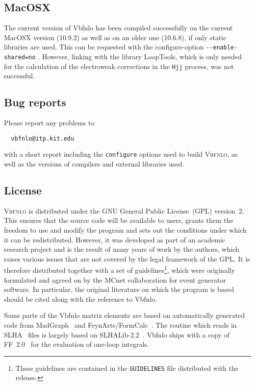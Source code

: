 \documentclass[english,12pt]{article}
\begin{document}
\subsection{MacOSX}

The current version of {\sc Vbfnlo} has been compiled successfully 
on the current MacOSX version (10.9.2) as well as on an older one
(10.6.8), if only static libraries are used. This can be
requested with the configure-option {\tt -{}-enable-shared=no} .
However, linking with the library {\sc LoopTools}, which is only
needed for the calculation of the electroweak corrections in the {\tt Hjj}
process, was not successful.



\subsection{Bug reports}

Please report any problems to
\begin{verbatim}
  vbfnlo@itp.kit.edu
\end{verbatim}
with a short report including the {\tt configure} options used to build
\textsc{Vbfnlo}, as well as the versions of compilers and external libraries
used.

\subsection{License}

\textsc{Vbfnlo} is distributed under the GNU General Public License~(GPL)
version~2. This ensures that the source code will be available to users,
grants them the freedom to use and modify the program and sets
out the conditions under which it can be redistributed. However, it was
developed as part of an academic research project and is the result of
many years of work by the authors, which raises various issues that are
not covered by the legal framework of the GPL. It is therefore
distributed together with a set of guidelines\footnote{These guidelines
are contained in the \texttt{GUIDELINES} file distributed with the
release.}, which were originally formulated and agreed on by the
MCnet collaboration for event generator software.
In particular, the original literature on which the program is based
should be cited along with the reference to {\sc Vbfnlo}.

Some parts of the {\sc Vbfnlo} matrix elements are based on automatically
generated code from {\sc MadGraph}~\cite{Stelzer:1994ta, Alwall:2007st}
and {\sc FeynArts/FormCalc}~\cite{Kublbeck:1990xc, Denner:1992vza, 
Kublbeck:1992mt, Hahn:2000kx, Hahn:2001rv, Hahn:1998yk, Hahn:2006zy, Hahn:2006qw}.
The routine which reads in SLHA~\cite{Allanach:2008qq} files is largely based 
on {\sc SLHALib-2.2}~\cite{Hahn:2006nq}.
{\sc Vbfnlo} ships with a copy of {\sc FF~2.0}~\cite{vanOldenborgh:1989wn}
for the evaluation of one-loop integrals.
\end{document}
